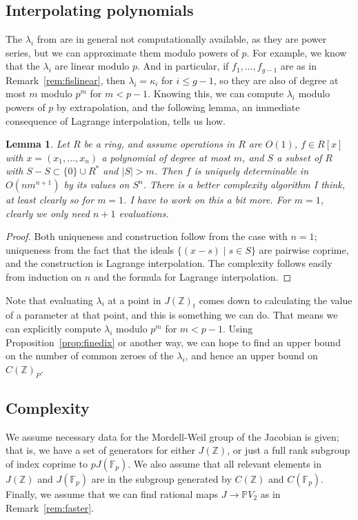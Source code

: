 \documentclass[12pt]{article}
\newcommand{\Z}{\mathbb{Z}}
\renewcommand{\P}{\mathbb{P}}
\newcommand{\F}{\mathbb{F}}
\theoremstyle{plain}
\newtheorem{lem}[thm]{Lemma} %
\theoremstyle{definition}
\theoremstyle{remark}
\begin{document}
\subsection{Interpolating polynomials}
\label{subs:interpolate}
The $\lambda_i$ from are in general not computationally available, as they are power series, but we can approximate them modulo powers of $p$. For example, we know that the $\lambda_i$ are linear modulo $p$. And in particular, if $f_1,\dots,f_{g-1}$ are as in Remark~\ref{rem:fislinear}, then $\lambda_i = \kappa_i$ for $i \leq g-1$, so they are also of degree at most $m$ modulo $p^m$ for $m < p-1$. Knowing this, we can compute $\lambda_i$ modulo powers of $p$ by extrapolation, and the following lemma, an immediate consequence of Lagrange interpolation, tells us how.
\begin{lem}
\label{lem:interpolate}
Let $R$ be a ring, and assume operations in $R$ are $O(1)$, $f \in R[x]$ with $x = (x_1,\dots,x_n)$ a polynomial of degree at most $m$, and $S$ a subset of $R$ with $S-S \subset \{0\} \cup R^*$ and $|S| > m$. Then $f$ is uniquely determinable in $O(nm^{n+1})$ by its values on $S^n$.  There is a better complexity algorithm I think, at least clearly so for $m=1$. I have to work on this a bit more. For $m = 1$, clearly we only need $n+1$ evaluations.
\end{lem}
\begin{proof}
Both uniqueness and construction follow from the case with $n=1$; uniqueness from the fact that the ideals $\{(x-s) \mid s \in S\}$ are pairwise coprime, and the construction is Lagrange interpolation. The complexity follows easily from induction on $n$ and the formula for Lagrange interpolation.
\end{proof}

Note that evaluating $\lambda_i$ at a point in $J(\Z)_t$ comes down to calculating the value of a parameter at that point, and this is something we can do. That means we can explicitly compute $\lambda_i$ modulo $p^m$ for $m < p-1$. Using Proposition~\ref{prop:finedix} or another way, we can hope to find an upper bound on the number of common zeroes of the $\lambda_i$, and hence an upper bound on $C(\Z)_P$.

\subsection{Complexity}
We assume necessary data for the Mordell-Weil group of the Jacobian is given; that is, we have a set of generators for either $J(\Z)$, or just a full rank subgroup of index coprime to $pJ(\F_p)$. We also assume that all relevant elements in $J(\Z)$ and $J(\F_p)$ are in the subgroup generated by $C(\Z)$ and $C(\F_p)$. Finally, we assume that we can find rational maps $J \to \P V_2$ as in Remark~\ref{rem:faster}.
\end{document}
